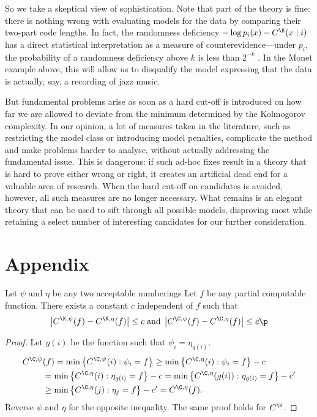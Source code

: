 So we take a skeptical view of sophistication. Note that part of the theory is fine: there is nothing wrong with evaluating models for the data by comparing their two-part code lengths. In fact, the randomness deficiency $-\log p_i(x)-C^\K(x\mid i)$ has a direct statistical interpretation as a measure of counterevidence---under $p_i$, the probability of a randomness deficiency above $k$ is less than $2^{-k}$ \cite[Lemma~6]{bloem2014safe}. In the Monet example above, this will allow us to disqualify the model expressing that the data is actually, say, a recording of jazz music.

But fundamental problems arise as soon as a hard cut-off is introduced on how far we are allowed to deviate from the minimum determined by the Kolmogorov complexity. In our opinion, a lot of measures taken in the literature, such as restricting the model class or introducing model penalties, complicate the method and make problems harder to analyse, without actually addressing the fundamental issue. This is dangerous: if such ad-hoc fixes result in a theory that is hard to prove either wrong or right, it creates an artificial dead end for a valuable area of research. When the hard cut-off on candidates is avoided, however, all such measures are no longer necessary. What remains is an elegant theory that can be used to sift through all possible models, disproving most while retaining a select number of interesting candidates for our further consideration.

\section{Appendix}
\begin{lemma}
Let $\psi$ and $\eta$ be any two acceptable numberings Let $f$ be any partial computable function. There exists a constant $c$ independent of $f$ such that \belowdisplayskip=-12pt
\[
\left| C^{\K,\psi}(f) - C^{\K, \eta}(f)\right | \leq c \;\text{and}\; \left| C^{\C,\psi}(f) - C^{\C, \eta}(f)\right | \leq c \p
\] \label{lemma:invariance}
\end{lemma}
\begin{proof}
Let $g(i)$ be the function such that $\psi_i=\eta_{g(i)}$.
\begin{align*}
C^{\C,\psi}&(f) = \min\left\{ C^{\C,\psi}(i) : \psi_i= f\right\} 
\geq \min\left\{ C^{\C, \eta}(i) : \psi_i= f\right\} - c\\
&= \min\left\{ C^{\C, \eta}(i) : \eta_{g(i)}= f\right\} - c
= \min\left\{ C^{\C, \eta}(g(i)) : \eta_{g(i)}= f\right\} - c'\\
&\geq \min\left\{ C^{\C, \eta}(j) : \eta_j= f\right\} - c' 
= C^{\C, \eta}(f).
\end{align*}
Reverse $\psi$ and $\eta$ for the opposite inequality. The same proof holds for $C^\K$.
\end{proof}


